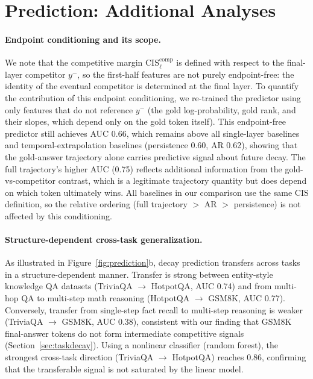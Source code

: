 \documentclass{article} %
\begin{document}
\section{Prediction: Additional Analyses}
\label{app:prediction}

\paragraph{Endpoint conditioning and its scope.}
We note that the competitive margin $\mathrm{CIS}^{\mathrm{comp}}_\ell$ is defined with respect to the final-layer competitor $y^-$, so the first-half features are not purely endpoint-free: the identity of the eventual competitor is determined at the final layer. To quantify the contribution of this endpoint conditioning, we re-trained the predictor using only features that do not reference $y^-$ (the gold log-probability, gold rank, and their slopes, which depend only on the gold token itself). This endpoint-free predictor still achieves AUC 0.66, which remains above all single-layer baselines and temporal-extrapolation baselines (persistence 0.60, AR 0.62), showing that the gold-answer trajectory alone carries predictive signal about future decay. The full trajectory's higher AUC (0.75) reflects additional information from the gold-vs-competitor contrast, which is a legitimate trajectory quantity but does depend on which token ultimately wins. All baselines in our comparison use the same CIS definition, so the relative ordering (full trajectory $>$ AR $>$ persistence) is not affected by this conditioning.

\paragraph{Structure-dependent cross-task generalization.}
As illustrated in Figure~\ref{fig:prediction}b, decay prediction transfers across tasks in a structure-dependent manner. Transfer is strong between entity-style knowledge QA datasets (TriviaQA $\to$ HotpotQA, AUC 0.74) and from multi-hop QA to multi-step math reasoning (HotpotQA $\to$ GSM8K, AUC 0.77). Conversely, transfer from single-step fact recall to multi-step reasoning is weaker (TriviaQA $\to$ GSM8K, AUC 0.38), consistent with our finding that GSM8K final-answer tokens do not form intermediate competitive signals (Section~\ref{sec:taskdecay}). Using a nonlinear classifier (random forest), the strongest cross-task direction (TriviaQA $\to$ HotpotQA) reaches 0.86, confirming that the transferable signal is not saturated by the linear model.
\end{document}
